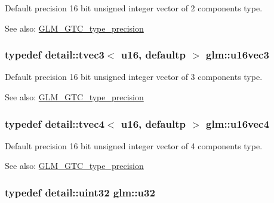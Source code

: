 Default precision 16 bit unsigned integer vector of 2 components type. \begin{Desc}
\item[See also:]\hyperlink{group__gtc__type__precision}{GLM\_\-GTC\_\-type\_\-precision} \end{Desc}
\hypertarget{group__gtc__type__precision_g372e1184da616b77fcbd48b8c166c24a}{
\subsubsection[u16vec3]{\setlength{\rightskip}{0pt plus 5cm}typedef detail::tvec3$<$ u16, defaultp $>$ {\bf glm::u16vec3}}}
\label{group__gtc__type__precision_g372e1184da616b77fcbd48b8c166c24a}


Default precision 16 bit unsigned integer vector of 3 components type. \begin{Desc}
\item[See also:]\hyperlink{group__gtc__type__precision}{GLM\_\-GTC\_\-type\_\-precision} \end{Desc}
\hypertarget{group__gtc__type__precision_gac02cce8820bcdbbeea9659aeaa718fb}{
\subsubsection[u16vec4]{\setlength{\rightskip}{0pt plus 5cm}typedef detail::tvec4$<$ u16, defaultp $>$ {\bf glm::u16vec4}}}
\label{group__gtc__type__precision_gac02cce8820bcdbbeea9659aeaa718fb}


Default precision 16 bit unsigned integer vector of 4 components type. \begin{Desc}
\item[See also:]\hyperlink{group__gtc__type__precision}{GLM\_\-GTC\_\-type\_\-precision} \end{Desc}
\hypertarget{group__gtc__type__precision_g54e837745059fd29017bed71cfa0a8db}{
\subsubsection[u32]{\setlength{\rightskip}{0pt plus 5cm}typedef detail::uint32 {\bf glm::u32}}}
\label{group__gtc__type__precision_g54e837745059fd29017bed71cfa0a8db}


